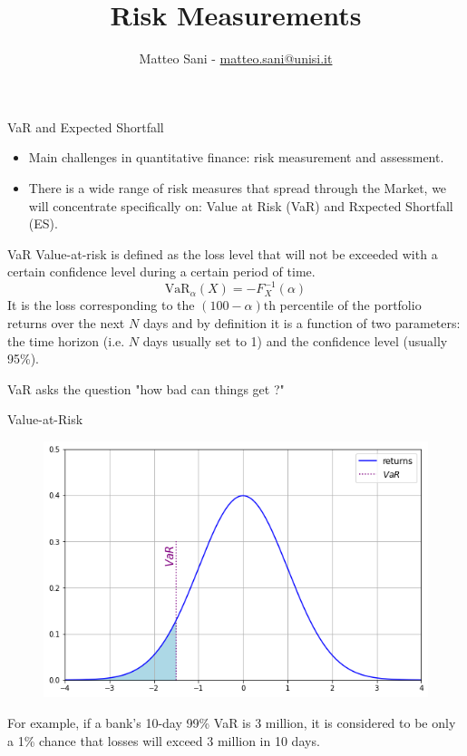 \documentclass{beamer}
\title{Risk Measurements}
\author{Matteo Sani - \href{mailto:matteo.sani@unisi.it}{matteo.sani@unisi.it}}
\begin{document}
\begin{frame}[plain]
	\maketitle
\end{frame}

\begin{frame}{VaR and Expected Shortfall}
  \begin{itemize}
  \item Main challenges in quantitative finance: risk measurement and assessment.
  \item There is a wide range of risk measures that spread through the Market, we will concentrate specifically on: Value at Risk (VaR) and Rxpected Shortfall (ES).
  \end{itemize}
  \begin{block}{VaR}
    Value-at-risk is defined as the loss level that will not be exceeded with a certain confidence level during a certain period of time.
    \begin{equation*}
      \textrm{VaR}_{\alpha}(X) = -F^{-1}_X(\alpha)
    \end{equation*}
It is the loss corresponding to the $(100-\alpha)\textrm{th}$ percentile of the portfolio returns over the next $N$ days and by definition it is a function of two parameters: the time horizon (i.e. $N$ days usually set to 1) and the confidence level (usually 95\%). 

VaR asks the question "how bad can things get ?"
\end{block}
\end{frame}

\begin{frame}{Value-at-Risk}
  \begin{figure}[h]
    \begin{center}
      \includegraphics[width=0.5\linewidth]{95_var}
    \end{center}
  \end{figure}
  For example, if a bank's 10-day 99\% VaR is 3 million, it is considered to be only a 1\% chance that losses will exceed 3 million in 10 days. 
\end{frame}
\end{document}
